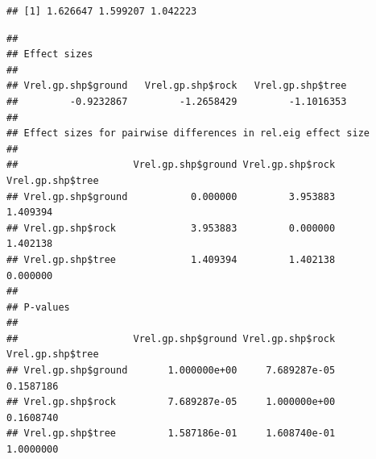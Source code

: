 \documentclass[
  11pt,
]{article}
\newenvironment{Shaded}{\begin{snugshade}}{\end{snugshade}}
\newcommand{\AttributeTok}[1]{\textcolor[rgb]{0.77,0.63,0.00}{#1}}
\newcommand{\ControlFlowTok}[1]{\textcolor[rgb]{0.13,0.29,0.53}{\textbf{#1}}}
\newcommand{\DecValTok}[1]{\textcolor[rgb]{0.00,0.00,0.81}{#1}}
\newcommand{\FloatTok}[1]{\textcolor[rgb]{0.00,0.00,0.81}{#1}}
\newcommand{\FunctionTok}[1]{\textcolor[rgb]{0.00,0.00,0.00}{#1}}
\newcommand{\NormalTok}[1]{#1}
\newcommand{\OtherTok}[1]{\textcolor[rgb]{0.56,0.35,0.01}{#1}}
\newcommand{\SpecialCharTok}[1]{\textcolor[rgb]{0.00,0.00,0.00}{#1}}
\begin{document}
\begin{Shaded}
\end{Shaded}

\begin{verbatim}
## [1] 1.626647 1.599207 1.042223
\end{verbatim}

\begin{Shaded}
\end{Shaded}

\begin{verbatim}
## 
## Effect sizes
## 
## Vrel.gp.shp$ground   Vrel.gp.shp$rock   Vrel.gp.shp$tree 
##         -0.9232867         -1.2658429         -1.1016353 
## 
## Effect sizes for pairwise differences in rel.eig effect size
## 
##                    Vrel.gp.shp$ground Vrel.gp.shp$rock Vrel.gp.shp$tree
## Vrel.gp.shp$ground           0.000000         3.953883         1.409394
## Vrel.gp.shp$rock             3.953883         0.000000         1.402138
## Vrel.gp.shp$tree             1.409394         1.402138         0.000000
## 
## P-values
## 
##                    Vrel.gp.shp$ground Vrel.gp.shp$rock Vrel.gp.shp$tree
## Vrel.gp.shp$ground       1.000000e+00     7.689287e-05        0.1587186
## Vrel.gp.shp$rock         7.689287e-05     1.000000e+00        0.1608740
## Vrel.gp.shp$tree         1.587186e-01     1.608740e-01        1.0000000
\end{verbatim}
\end{document}
